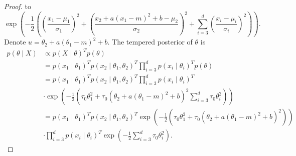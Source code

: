 \documentclass[english,twoside,openright]{HYgraduMLDS}
\begin{document}
\begin{appendices}
\begin{proof}
    to
    \[
    \exp
    \left(-\frac{1}{2}\left(\left(\frac{x_1 - \mu_1}{\sigma_1}\right)^2
    + \left(\frac{x_2 + a(x_1 - m)^2 + b - \mu_2}{\sigma_2}\right)^2
    + \sum_{i=3}^d\left(\frac{x_i - \mu_i}{\sigma_i}\right)^2\right)\right).
    \]
    Denote \(u = \theta_2 + a(\theta_1 - m)^2 + b\).
    The tempered posterior of \(\theta\) is
    \begin{align*}
        p(\theta\mid X) &\propto p(X\mid \theta)^Tp(\theta)
        \\&= p(x_1\mid \theta_1)^Tp(x_2\mid \theta_1, \theta_2)^T
        \prod_{i=3}^d p(x_i\mid \theta_i)^T p(\theta)
        \\&= p(x_1\mid \theta_1)^Tp(x_2\mid \theta_1, \theta_2)^T
        \prod_{i=3}^d p(x_i\mid \theta_i)^T
        \\&\cdot \exp\left(-\frac{1}{2}\left(\tau_0\theta_1^2
        + \tau_0(\theta_2 + a(\theta_1 - m)^2 + b)^2
        \sum_{i=3}^d \tau_0\theta_i^2\right)\right)
        \\&= p(x_1\mid \theta_1)^Tp(x_2\mid \theta_1, \theta_2)^T
        \exp\left(-\frac{1}{2}\left(\tau_0\theta_1^2
        + \tau_0(\theta_2 + a(\theta_1 - m)^2 + b)^2\right)\right)
        \\&\cdot \prod_{i=3}^d p(x_i\mid \theta_i)^T
        \exp\left(-\frac{1}{2}\sum_{i=3}^d \tau_0\theta_i^2\right).
    \end{align*}


\end{proof}
\end{appendices}
\end{document}

